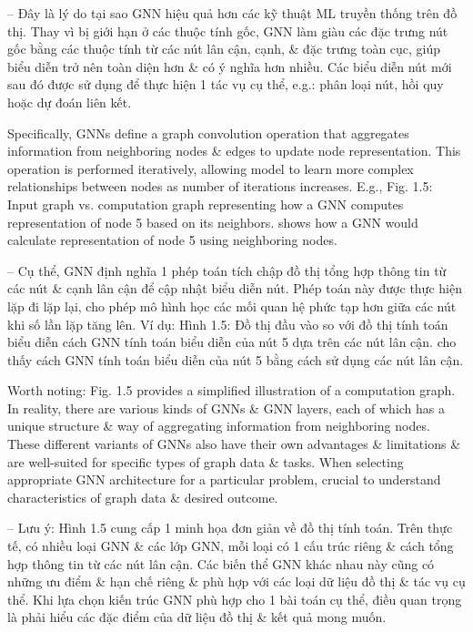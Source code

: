 \documentclass{article}
\begin{document}
\begin{itemize}
\begin{itemize}
        -- Đây là lý do tại sao GNN hiệu quả hơn các kỹ thuật ML truyền thống trên đồ thị. Thay vì bị giới hạn ở các thuộc tính gốc, GNN làm giàu các đặc trưng nút gốc bằng các thuộc tính từ các nút lân cận, cạnh, \& đặc trưng toàn cục, giúp biểu diễn trở nên toàn diện hơn \& có ý nghĩa hơn nhiều. Các biểu diễn nút mới sau đó được sử dụng để thực hiện 1 tác vụ cụ thể, e.g.: phân loại nút, hồi quy hoặc dự đoán liên kết.

        Specifically, GNNs define a graph convolution operation that aggregates information from neighboring nodes \& edges to update node representation. This operation is performed iteratively, allowing model to learn more complex relationships between nodes as number of iterations increases. E.g., {\sf Fig. 1.5: Input graph vs. computation graph representing how a GNN computes representation of node 5 based on its neighbors.} shows how a GNN would calculate representation of node 5 using neighboring nodes.

        -- Cụ thể, GNN định nghĩa 1 phép toán tích chập đồ thị tổng hợp thông tin từ các nút \& cạnh lân cận để cập nhật biểu diễn nút. Phép toán này được thực hiện lặp đi lặp lại, cho phép mô hình học các mối quan hệ phức tạp hơn giữa các nút khi số lần lặp tăng lên. Ví dụ: {\sf Hình 1.5: Đồ thị đầu vào so với đồ thị tính toán biểu diễn cách GNN tính toán biểu diễn của nút 5 dựa trên các nút lân cận.} cho thấy cách GNN tính toán biểu diễn của nút 5 bằng cách sử dụng các nút lân cận.

        Worth noting: {\sf Fig. 1.5} provides a simplified illustration of a computation graph. In reality, there are various kinds of GNNs \& GNN layers, each of which has a unique structure \& way of aggregating information from neighboring nodes. These different variants of GNNs also have their own advantages \& limitations \& are well-suited for specific types of graph data \& tasks. When selecting appropriate GNN architecture for a particular problem, crucial to understand characteristics of graph data \& desired outcome.

        -- Lưu ý: {\sf Hình 1.5} cung cấp 1 minh họa đơn giản về đồ thị tính toán. Trên thực tế, có nhiều loại GNN \& các lớp GNN, mỗi loại có 1 cấu trúc riêng \& cách tổng hợp thông tin từ các nút lân cận. Các biến thể GNN khác nhau này cũng có những ưu điểm \& hạn chế riêng \& phù hợp với các loại dữ liệu đồ thị \& tác vụ cụ thể. Khi lựa chọn kiến trúc GNN phù hợp cho 1 bài toán cụ thể, điều quan trọng là phải hiểu các đặc điểm của dữ liệu đồ thị \& kết quả mong muốn.


\end{itemize}
\end{itemize}
\end{document}
